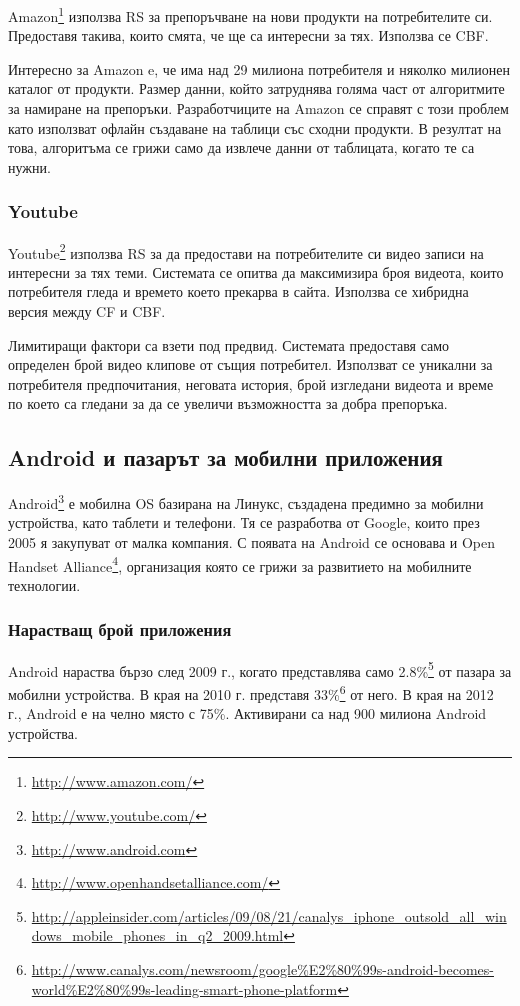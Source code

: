			Amazon\footnote{\url{http://www.amazon.com/}} използва \ac{RS} за препоръчване на нови продукти на потребителите си. Предоставя такива, които смята, че ще са интересни за тях. Използва се \ac{CBF}.
			
			Интересно за Amazon e, че има над 29 милиона потребителя и няколко милионен каталог от продукти. Размер данни, който затруднява голяма част от алгоритмите за намиране на препоръки. Разработчиците на Amazon се справят с този проблем като използват офлайн създаване на таблици със сходни продукти. В резултат на това, алгоритъма се грижи само да извлече данни от таблицата, когато те са нужни.
	
		\subsubsection{Youtube}
		
			Youtube\footnote{\url{http://www.youtube.com/}} използва \ac{RS} за да предостави на потребителите си видео записи на интересни за тях теми. Системата се опитва да максимизира броя видеота, които потребителя гледа и времето което прекарва в сайта. Използва се хибридна версия между \ac{CF} и \ac{CBF}.
			
			Лимитиращи фактори са взети под предвид. Системата предоставя само определен брой видео клипове от същия потребител. Използват се уникални за потребителя предпочитания, неговата история, брой изгледани видеота и време по което са гледани за да се увеличи възможността за добра препоръка.
	
	\subsection{Android и пазарът за мобилни приложения}
	
		Android\footnote{\url{http://www.android.com}} е мобилна \ac{OS} базирана на Линукс, създадена предимно за мобилни устройства, като таблети и телефони. Тя се разработва от Google, които през 2005 я закупуват от малка компания\cite{Elgin}. С появата на Android се основава и Open Handset Alliance\footnote{\url{http://www.openhandsetalliance.com/}}, организация която се грижи за развитието на мобилните технологии.
	
		\subsubsection{Нарастващ брой приложения}
	
			Android нараства бързо след 2009 г., когато представлява само 2.8\%\footnote{\url{http://appleinsider.com/articles/09/08/21/canalys_iphone_outsold_all_windows_mobile_phones_in_q2_2009.html}} от пазара за мобилни устройства. В края на 2010 г. представя 33\%\footnote{\url{http://www.canalys.com/newsroom/google\%E2\%80\%99s-android-becomes-world\%E2\%80\%99s-leading-smart-phone-platform}} от него. В края на 2012 г., Android е на челно място с 75\%\cite{IDC}. Активирани са над 900 милиона Android устройства\cite{Google}.
			
